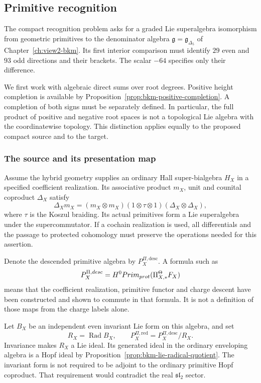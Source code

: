 \subsection{Primitive recognition}
\label{subsec:primitive-recognition}

The compact recognition problem asks for a graded Lie superalgebra
isomorphism from geometric primitives to the denominator algebra
$\mathfrak g=\mathfrak g_{\Delta_5}$ of
Chapter~\ref{ch:view2-bkm}. Its first interior comparison must identify
$29$ even and $93$ odd directions and their brackets. The scalar
$-64$ specifies only their difference.

We first work with algebraic direct sums over root degrees. Positive
height completion is available by
Proposition~\ref{prop:bkm-positive-completion}. A completion of both
signs must be separately defined. In particular, the full product of
positive and negative root spaces is not a topological Lie algebra
with the coordinatewise topology. This distinction applies equally
to the proposed compact source and to the target.

\subsubsection*{The source and its presentation map}

Assume the hybrid geometry supplies an ordinary Hall super-bialgebra
$H_X$ in a specified coefficient realization. Its associative
product $m_X$, unit and counital coproduct $\Delta_X$ satisfy
\[
 \Delta_Xm_X=(m_X\otimes m_X)(1\otimes\tau\otimes1)
                         (\Delta_X\otimes\Delta_X),
\]
where $\tau$ is the Koszul braiding. Its actual primitives form a
Lie superalgebra under the supercommutator. If a cochain realization
is used, all differentials and the passage to protected cohomology
must preserve the operations needed for this assertion.

Denote the descended primitive algebra by $P_X^{\Pi,\mathrm{desc}}$.
A formula such as
\[
 P_X^{\Pi,desc}=
 H^0Prim_{prot}(\Pi_{X,*}^{\Theta}F_X)
\]
means that the coefficient realization, primitive functor and charge
descent have been constructed and shown to commute in that formula.
It is not a definition of those maps from the charge labels alone.

Let $B_X$ be an independent even invariant Lie form on this algebra,
and set
\[
 R_X=\operatorname{Rad}B_X,\qquad
 P_X^{\Pi,\mathrm{red}}=P_X^{\Pi,\mathrm{desc}}/R_X.
\]
Invariance makes $R_X$ a Lie ideal. Its generated ideal in the
ordinary enveloping algebra is a Hopf ideal by
Proposition~\ref{prop:bkm-lie-radical-quotient}.
The invariant form is not required to be adjoint to the ordinary
primitive Hopf coproduct. That requirement would contradict the
real $\mathfrak{sl}_2$ sector.

